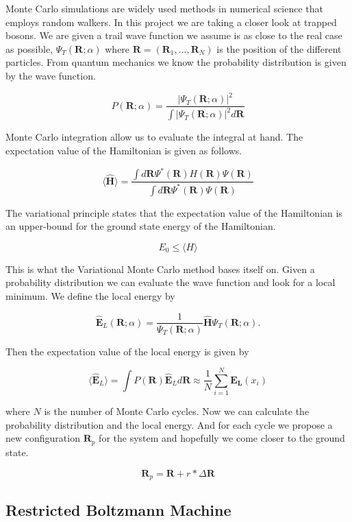 Monte Carlo simulations are widely used methods in numerical science that employs random walkers. 
In this project we are taking a closer look at trapped bosons. We are given a trail wave function we assume is as close to the real case as possible, $\Psi_T(\mathbf{R};\alpha)$ where $\mathbf{R} = (\mathbf{R}_1, ... , \mathbf{R}_N)$ is the position of the different particles. 
From quantum mechanics we know the probability distribution is given by the wave function. 

$$P(\mathbf{R}; \alpha) = \frac{|\Psi_T(\mathbf{R};\alpha)|^2}{\int |\Psi_T(\mathbf{R};\alpha)|^2 d\mathbf{R}}$$

Monte Carlo integration allow us to evaluate the integral at hand. The expectation value of the Hamiltonian is given as follows. 

$$\langle \widehat{\mathbf{H}}\rangle = \frac{\int d \mathbf{R} \Psi^{\ast} (\mathbf{R})H(\mathbf{R}) \Psi(\mathbf{R})}{\int d \mathbf{R} \Psi^{\ast} (\mathbf{R}) \Psi(\mathbf{R})}$$

The variational principle states that the expectation value of the Hamiltonian is an upper-bound for the ground state energy of the Hamiltonian.

$$E_0 \leq \langle H \rangle$$

This is what the Variational Monte Carlo method bases itself on. Given a probability distribution we can evaluate the wave function and look for a local minimum. We define the local energy by

$$\widehat{\mathbf{E}}_L(\mathbf{R};\alpha) = \frac{1}{\Psi_T(\mathbf{R};\alpha)}\widehat{\mathbf{H}}\Psi_T(\mathbf{R};\alpha).$$

Then the expectation value of the local energy is given by

$$\langle \widehat{\mathbf{E}}_L\rangle = \int P(\mathbf{R}) \widehat{\mathbf{E}}_L d\mathbf{R} \approx \frac{1}{N} \sum_{i = 1}^N \mathbf{E_L}(x_i)$$

where $N$ is the number of Monte Carlo cycles. Now we can calculate the probability distribution and the local energy. And for each cycle we propose a new configuration $\mathbf{R}_p$ for the system and hopefully we come closer to the ground state.

$$\mathbf{R}_p = \mathbf{R} + r \ast \Delta \mathbf{R}$$

\subsection{Restricted Boltzmann Machine}\label{sec:rbm}

